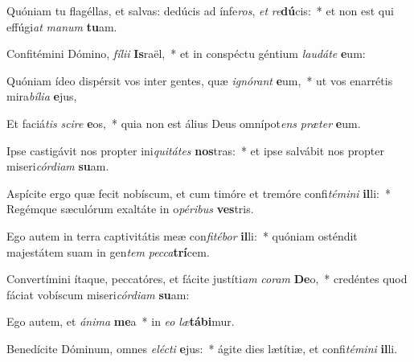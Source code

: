 \item Quóniam tu flagéllas, et salvas: dedúcis ad ínfe\textit{ros}, \textit{et} \textit{re}\textbf{dú}cis:~* et non est qui effúgi\textit{at} \textit{ma}\textit{num} \textbf{tu}am.
\item Confitémini Dómino, \textit{fí}\textit{li}\textit{i} \textbf{Is}raël,~* et in conspéctu géntium \textit{lau}\textit{dá}\textit{te} \textbf{e}um:
\item Quóniam ídeo dispérsit vos inter gentes, quæ \textit{i}\textit{gnó}\textit{rant} \textbf{e}um,~* ut vos enarrétis mira\textit{bí}\textit{li}\textit{a} \textbf{e}jus,
\item Et faciá\textit{tis} \textit{sci}\textit{re} \textbf{e}os,~* quia non est álius Deus omnípot\textit{ens} \textit{præ}\textit{ter} \textbf{e}um.
\item Ipse castigávit nos propter ini\textit{qui}\textit{tá}\textit{tes} \textbf{nos}tras:~* et ipse salvábit nos propter miseri\textit{cór}\textit{di}\textit{am} \textbf{su}am.
\item Aspícite ergo quæ fecit nobíscum, et cum timóre et tremóre confi\textit{té}\textit{mi}\textit{ni} \textbf{il}li:~* Regémque sæculórum exaltáte in o\textit{pé}\textit{ri}\textit{bus} \textbf{ves}tris.
\item Ego autem in terra captivitátis meæ con\textit{fi}\textit{té}\textit{bor} \textbf{il}li:~* quóniam osténdit majestátem suam in gen\textit{tem} \textit{pec}\textit{ca}\textbf{trí}cem.
\item Convertímini ítaque, peccatóres, et fácite justíti\textit{am} \textit{co}\textit{ram} \textbf{De}o,~* credéntes quod fáciat vobíscum miseri\textit{cór}\textit{di}\textit{am} \textbf{su}am:
\item Ego autem, et \textit{á}\textit{ni}\textit{ma} \textbf{me}a~* in \textit{e}\textit{o} \textit{læ}\textbf{tá}\textbf{bi}mur.
\item Benedícite Dóminum, omnes \textit{e}\textit{léc}\textit{ti} \textbf{e}jus:~* ágite dies lætítiæ, et confi\textit{té}\textit{mi}\textit{ni} \textbf{il}li.
